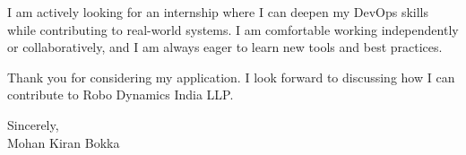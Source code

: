 \documentclass[10pt, letterpaper]{article}
\begin{document}
\vspace{4pt}

\noindent I am actively looking for an internship where I can deepen my DevOps skills while contributing to real-world systems. I am comfortable working independently or collaboratively, and I am always eager to learn new tools and best practices.

\vspace{4pt}

\noindent Thank you for considering my application. I look forward to discussing how I can contribute to Robo Dynamics India LLP.

\vspace{8pt}

\noindent Sincerely, \\
Mohan Kiran Bokka
\end{document}
